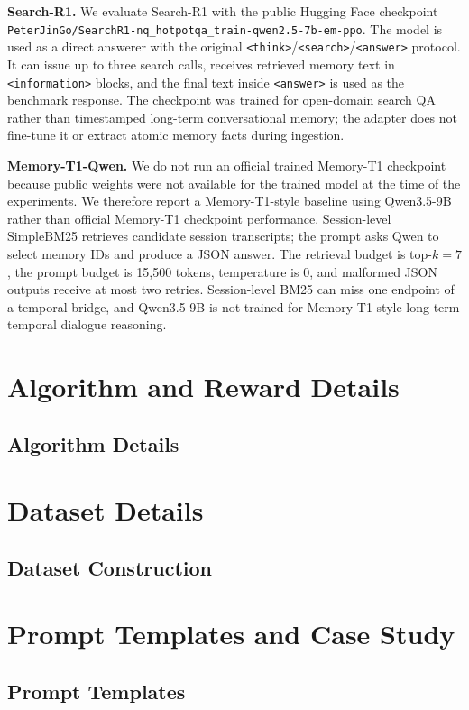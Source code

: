 \textbf{Search-R1.}
We evaluate Search-R1 \cite{jin2025searchr1} with the public Hugging Face
checkpoint \texttt{PeterJinGo/SearchR1-nq\_hotpotqa\_train-qwen2.5-7b-em-ppo}.
The model is used as a direct answerer with the original
\texttt{<think>}/\texttt{<search>}/\texttt{<answer>} protocol. It can issue up
to three search calls, receives retrieved memory text in \texttt{<information>}
blocks, and the final text inside \texttt{<answer>} is used as the benchmark
response. The checkpoint was trained for open-domain search QA rather than
timestamped long-term conversational memory; the adapter does not fine-tune it
or extract atomic memory facts during ingestion.

\textbf{Memory-T1-Qwen.}
We do not run an official trained Memory-T1 checkpoint because public weights
were not available for the trained model at the time of the experiments. We
therefore report a Memory-T1-style baseline using Qwen3.5-9B rather than
official Memory-T1 checkpoint performance. Session-level SimpleBM25 retrieves
candidate session transcripts; the prompt asks Qwen to select memory IDs and
produce a JSON answer. The retrieval budget is top-\(k=7\), the prompt budget
is 15,500 tokens, temperature is 0, and malformed JSON outputs receive at most
two retries. Session-level BM25 can miss one endpoint of a temporal bridge, and
Qwen3.5-9B is not trained for Memory-T1-style long-term temporal dialogue
reasoning.

\chapter{Algorithm and Reward Details}
\label{app:algorithm-reward-details}

\section{Algorithm Details}


\chapter{Dataset Details}
\label{app:dataset-details}

\section{Dataset Construction}


\chapter{Prompt Templates and Case Study}
\label{app:prompt-templates-and-case-study}

\section{Prompt Templates}


